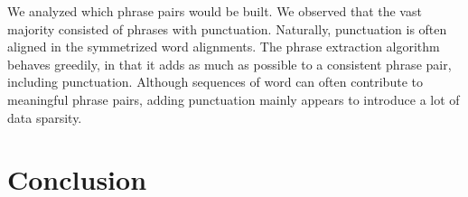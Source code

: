 \documentclass[11pt]{article}
\begin{document}
We analyzed which phrase pairs would be built. We observed that the vast majority consisted of phrases with punctuation. Naturally, punctuation is often aligned in the symmetrized word alignments. The phrase extraction algorithm behaves greedily, in that it adds as much as possible to a consistent phrase pair, including punctuation. Although sequences of word can often contribute to meaningful phrase pairs, adding punctuation mainly appears to introduce a lot of data sparsity. 


\section{Conclusion}
\label{Concl}
\end{document}
